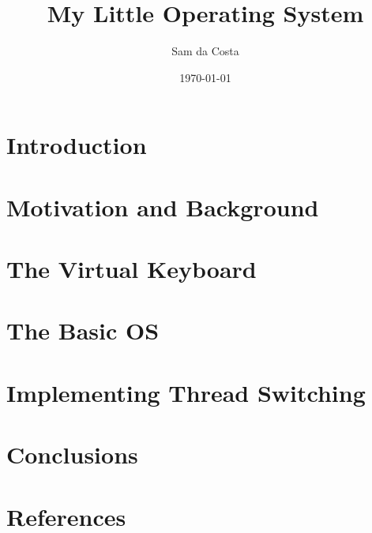 \documentclass[11pt]{article}
\title{ My Little Operating System }
\author{ Sam da Costa }
\date{\today}
\begin{document}
\maketitle	
\pagebreak


\tableofcontents
\pagebreak


\section{Introduction}

\pagebreak
\section{Motivation and Background}

\pagebreak
\section{The Virtual Keyboard}

\pagebreak
\section{The Basic OS}

\pagebreak
\section{Implementing Thread Switching}

\pagebreak
\section{Conclusions}

\pagebreak
\section{References}

\pagebreak
\end{document}
